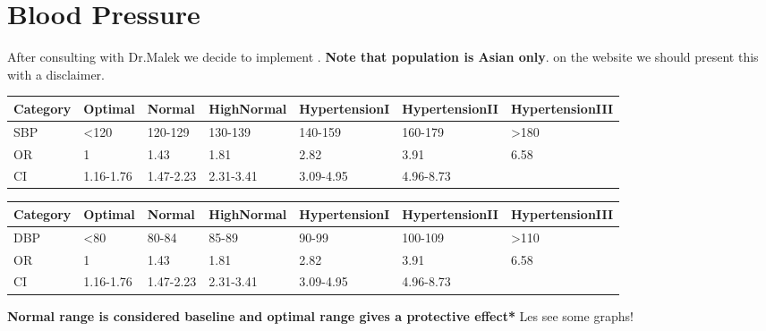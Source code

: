 \documentclass{report}
\begin{document}
\section{\color{blue}Blood Pressure}
After consulting with Dr.Malek we decide to implement 
\citet{Kim2005}. {\bf \color{red} Note that population is Asian only}. on the website we should present this with a disclaimer.
\newline \newline
\begin{tabular}{|l|l|l|l|l|l|l|}
\hline
Category & Optimal & Normal & HighNormal & HypertensionI & HypertensionII & HypertensionIII \\ \hline
SBP & <120 & 120-129 & 130-139 & 140-159 & 160-179 & >180 \\ \hline
OR & 1 & 1.43 & 1.81 & 2.82 & 3.91 & 6.58\\ \hline
CI & 1.16-1.76 & 1.47-2.23 & 2.31-3.41 & 3.09-4.95 & 4.96-8.73\\ \hline
\end{tabular}
\newline \newline \newline \newline
\begin{tabular}{|l|l|l|l|l|l|l|}
\hline
Category & Optimal & Normal & HighNormal & HypertensionI & HypertensionII & HypertensionIII \\ \hline
DBP & <80 & 80-84 & 85-89 & 90-99 & 100-109 & >110 \\ \hline
OR & 1 & 1.43 & 1.81 & 2.82 & 3.91 & 6.58\\ \hline
CI & 1.16-1.76 & 1.47-2.23 & 2.31-3.41 & 3.09-4.95 & 4.96-8.73\\ \hline
\end{tabular}
\newline 
{\bf *Normal range is considered baseline and optimal range gives a protective effect*}
Les see some graphs!
\end{document}
